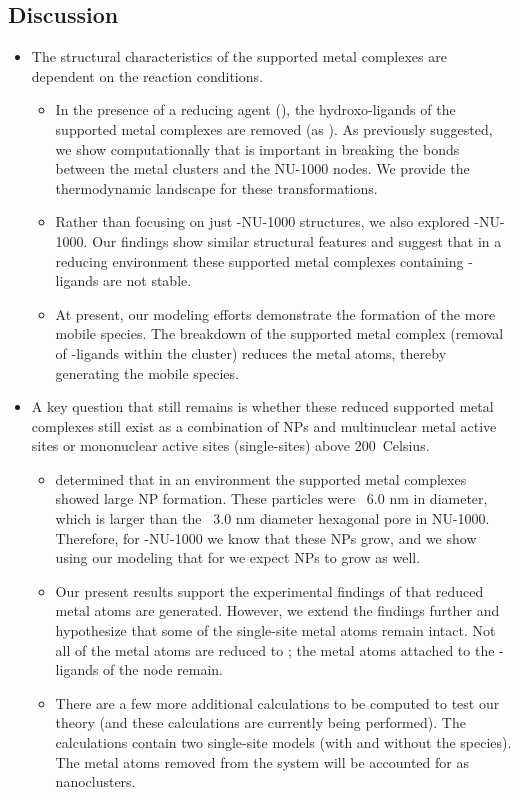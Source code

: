 \documentclass[journal=jctcce,manuscript=article]{achemso}
\begin{document}
\subsection{Discussion}
\begin{itemize}
    \item The structural characteristics of the supported metal complexes are dependent on the reaction conditions.
    \begin{itemize}
        \item In the presence of a reducing agent (), the hydroxo-ligands of the supported metal complexes are removed (as ). As previously suggested, we show computationally that  is important in breaking the bonds between the metal clusters and the NU-1000 nodes. We provide the thermodynamic landscape for these transformations.
        \item Rather than focusing on just -NU-1000 structures, we also explored -NU-1000. Our findings show similar structural features and suggest that in a reducing environment these supported metal complexes containing -ligands are not stable.  
        \item At present, our modeling efforts demonstrate the formation of the more mobile  species. The breakdown of the supported metal complex (removal of -ligands within the cluster) reduces the metal atoms, thereby generating the mobile  species.
    \end{itemize}
    \item A key question that still remains is whether these reduced supported metal complexes still exist as a combination of NPs and multinuclear metal active sites or mononuclear active sites (single-sites) above \SI{200}{Celsius}.
    \begin{itemize}
        \item \citeauthor{Halder2020} determined that in an  environment the  supported metal complexes showed large  NP formation. These particles were ~6.0 nm in diameter, which is larger than the ~3.0 nm diameter hexagonal pore in NU-1000. Therefore, for -NU-1000 we know that these NPs grow, and we show using our modeling that for  we expect  NPs to grow as well. 
        \item Our present results support the experimental findings of \citeauthor{Halder2020} that reduced metal atoms are generated. However, we extend the findings further and hypothesize that some of the single-site metal atoms remain intact. Not all of the metal atoms are reduced to ; the metal atoms attached to the -ligands of the node remain. 
        \item There are a few more additional calculations to be computed to test our theory (and these calculations are currently being performed). The calculations contain two single-site models (with and without the  species). The metal atoms removed from the system will be accounted for as nanoclusters.
    \end{itemize}
\end{itemize}
\end{document}
